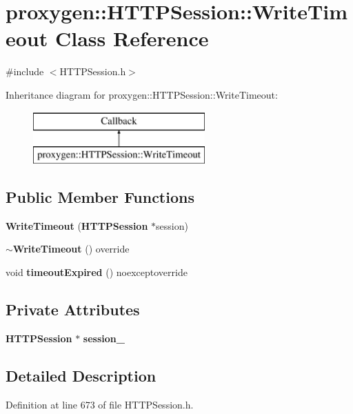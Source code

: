\section{proxygen\+:\+:H\+T\+T\+P\+Session\+:\+:Write\+Timeout Class Reference}
\label{classproxygen_1_1HTTPSession_1_1WriteTimeout}


{\ttfamily \#include $<$H\+T\+T\+P\+Session.\+h$>$}

Inheritance diagram for proxygen\+:\+:H\+T\+T\+P\+Session\+:\+:Write\+Timeout\+:\begin{figure}[H]
\begin{center}
\leavevmode
\includegraphics[height=2.000000cm]{classproxygen_1_1HTTPSession_1_1WriteTimeout}
\end{center}
\end{figure}
\subsection*{Public Member Functions}
\begin{DoxyCompactItemize}
\item 
{\bf Write\+Timeout} ({\bf H\+T\+T\+P\+Session} $\ast$session)
\item 
{\bf $\sim$\+Write\+Timeout} () override
\item 
void {\bf timeout\+Expired} () noexceptoverride
\end{DoxyCompactItemize}
\subsection*{Private Attributes}
\begin{DoxyCompactItemize}
\item 
{\bf H\+T\+T\+P\+Session} $\ast$ {\bf session\+\_\+}
\end{DoxyCompactItemize}


\subsection{Detailed Description}


Definition at line 673 of file H\+T\+T\+P\+Session.\+h.



